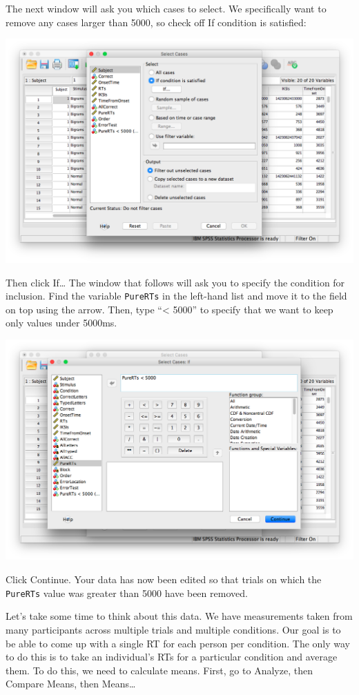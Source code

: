 \documentclass[
]{book}
\begin{document}
The next window will ask you which cases to select. We specifically want to remove any cases larger than 5000, so check off {If condition is satisfied:}

\includegraphics{img/9.4.16.png}

Then click {If\ldots{}} The window that follows will ask you to specify the condition for inclusion. Find the variable \texttt{PureRTs} in the left-hand list and move it to the field on top using the arrow. Then, type ``\textless{} 5000'' to specify that we want to keep only values under 5000ms.

\includegraphics{img/9.4.17.png}

Click {Continue}. Your data has now been edited so that trials on which the \texttt{PureRTs} value was greater than 5000 have been removed.

Let's take some time to think about this data. We have measurements taken from many participants across multiple trials and multiple conditions. Our goal is to be able to come up with a single RT for each person per condition. The only way to do this is to take an individual's RTs for a particular condition and average them. To do this, we need to calculate means. First, go to {Analyze}, then {Compare Means}, then { Means\ldots{}}
\end{document}
